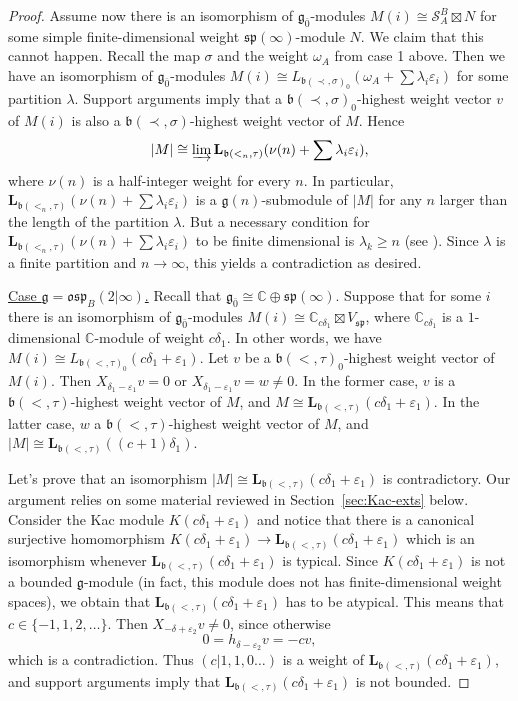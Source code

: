 \documentclass[12pt]{amsart}
\newcommand\C{\mathbb{C}}
\newcommand\g{\mathfrak{g}}
\newcommand\fb{\mathfrak{b}}
\newcommand\fsp{\mathfrak{sp}}
\newcommand\fosp{\mathfrak{osp}}
\newcommand\cS{\mathcal{S}}
\newcommand\bL{\mathbf{L}}
\theoremstyle{plain}
\theoremstyle{definition}
\numberwithin{equation}{section}
\begin{document}
\begin{proof}
Assume now there is an isomorphism of $\g_{\bar 0}$-modules $M(i)\cong \cS_A^B\boxtimes N$ for some simple finite-dimensional weight $\fsp(\infty)$-module $N$. We claim that this cannot happen. Recall the map $\sigma$ and the weight $\omega_A$ from case 1 above. Then we have an isomorphism of $\g_{\bar 0}$-modules $M(i)\cong L_{\fb(\prec,\sigma)_0}(\omega_A + \sum \lambda_i\varepsilon_i)$ for some partition $\lambda$. Support arguments imply that a $\fb(\prec,\sigma)_0$-highest weight vector $v$ of $M(i)$ is also a $\fb(\prec,\sigma)$-highest weight vector of $M$. Hence
	\[
|M|\cong\varinjlim \bL_{\fb(<_n,\tau)}(\nu(n) + \sum \lambda_i\varepsilon_i),
	\]
where $\nu(n)$ is a half-integer weight for every $n$. In particular, $\bL_{\fb(<_n,\tau)}(\nu(n) + \sum \lambda_i\varepsilon_i)$ is a $\g(n)$-submodule of $|M|$ for any $n$ larger than the length of the partition $\lambda$. But a necessary condition for $\bL_{\fb(<_n,\tau)}(\nu(n) + \sum \lambda_i\varepsilon_i)$ to be finite dimensional is $\lambda_k\geq n$ (see \cite[Proposition~2.3]{Kac78}). Since $\lambda$ is a finite partition and $n\to \infty$, this yields a contradiction as desired.



\underline{Case $\g = \fosp_B(2|\infty)$.} Recall that $\g_{\bar 0} \cong \C \oplus \fsp(\infty)$. Suppose that for some $i$ there is an isomorphism of $\g_{\bar 0}$-modules $M(i)\cong \C_{c\delta_1}\boxtimes V_\fsp$, where $\C_{c\delta_1}$ is a $1$-dimensional $\C$-module of weight $c\delta_1$. In other words, we have $M(i)\cong L_{\fb(<,\tau)_0}(c\delta_1 + \varepsilon_1)$. Let $v$ be a $\fb(<,\tau)_0$-highest weight vector of $M(i)$. Then $X_{\delta_1 - \varepsilon_1}v = 0$ or $X_{\delta_1 - \varepsilon_1}v = w\neq 0$. In the former case, $v$ is a $\fb(<,\tau)$-highest weight vector of $M$, and $M\cong \bL_{\fb(<,\tau)}(c\delta_1 + \varepsilon_1)$. In the latter case, $w$ a $\fb(<,\tau)$-highest weight vector of $M$, and $|M|\cong \bL_{\fb(<,\tau)}((c+1)\delta_1)$. 

Let's prove that an isomorphism $|M|\cong \bL_{\fb(<,\tau)}(c\delta_1 + \varepsilon_1)$ is contradictory. Our argument relies on some material reviewed in Section~\ref{sec:Kac-exts} below. Consider the Kac module $K(c\delta_1 + \varepsilon_1)$ and notice that there is a canonical surjective homomorphism $K(c\delta_1 + \varepsilon_1)\to \bL_{\fb(<,\tau)}(c\delta_1 + \varepsilon_1)$ which is an isomorphism whenever $\bL_{\fb(<,\tau)}(c\delta_1 + \varepsilon_1)$ is typical. Since $K(c\delta_1 + \varepsilon_1)$ is not a bounded $\g$-module (in fact, this module does not has finite-dimensional weight spaces), we obtain that $\bL_{\fb(<,\tau)}(c\delta_1 + \varepsilon_1)$ has to be atypical. This means that $c\in \{-1,1,2,\ldots \}$. Then $X_{-\delta + \varepsilon_2}v\neq 0$, since otherwise 
	\[
0=h_{\delta - \varepsilon_2}v=-cv,
	\]
which is a contradiction. Thus $(c|1,1,0\ldots)$ is a weight of $\bL_{\fb(<,\tau)}(c\delta_1 + \varepsilon_1)$, and support arguments imply that $\bL_{\fb(<,\tau)}(c\delta_1 + \varepsilon_1)$ is not bounded. 


\end{proof}
\end{document}
